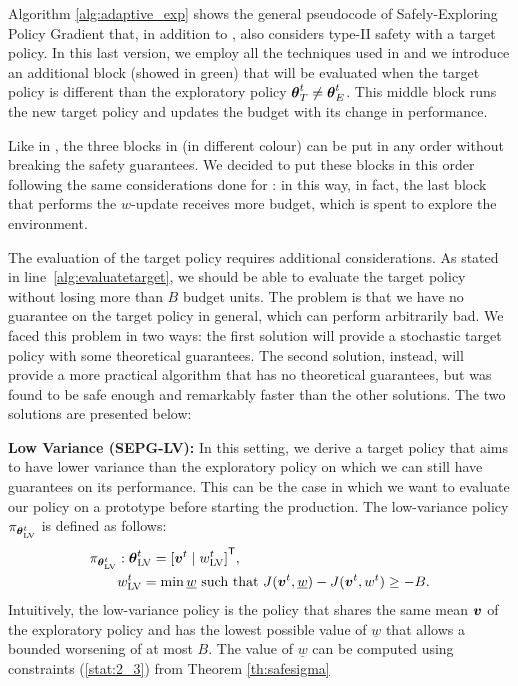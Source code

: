 Algorithm \ref{alg:adaptive_exp} shows the general pseudocode of Safely-Exploring Policy Gradient that, in addition to , also considers type-II safety with a target policy. In this last version, we employ all the techniques used in  and we introduce an additional block (showed in green) that will be evaluated when the target policy is different than the exploratory policy ${{\boldsymbol{\theta}}}^{t}_T \neq {\boldsymbol{\theta}}_E^t$. This middle block runs the new target policy and updates the budget with its change in performance.

\begin{note}
Like in , the three blocks in  (in different colour) can be put in any order without breaking the safety guarantees. We decided to put these blocks in this order following the same considerations done for : in this way, in fact, the last block that performs the $w$-update receives more budget, which is spent to explore the environment.
\end{note}

The evaluation of the target policy requires additional considerations. As stated in line~\ref{alg:evaluatetarget}, we should be able to evaluate the target policy without losing more than $B$ budget units. The problem is that we have no guarantee on the target policy in general, which can perform arbitrarily bad. We faced this problem in two ways: the first solution will provide a stochastic target policy with some theoretical guarantees. The second solution, instead, will provide a more practical algorithm that has no theoretical guarantees, but was found to be safe enough and remarkably faster than the other solutions. The two solutions are presented below:

\textbf{Low Variance (SEPG-LV):} In this setting, we derive a target policy that aims to have lower variance than the exploratory policy on which we can still have guarantees on its performance. This can be the case in which we want to evaluate our policy on a prototype before starting the production. The low-variance policy $\pi_{{\boldsymbol{\theta}}^t_{\text{LV}}}$ is defined as follows:
\begin{align*}
\pi_{{\boldsymbol{\theta}}^t_{\text{LV}}} &: {\boldsymbol{\theta}}^t_{\text{LV}} = {[\boldsymbol{v}^t \mid w^t_{\text{LV}}]}^{\mathsf{T}}, \\
&w^t_{\text{LV}} = \min {\underline{w}} \text{ such that } J(\boldsymbol{v}^t, \underline{w}) - J(\boldsymbol{v}^t, w^t) \geq -B .
\end{align*}
Intuitively, the low-variance policy is the policy that shares the same mean $\boldsymbol{v}$ of the exploratory policy and has the lowest possible value of $\underline{w}$ that allows a bounded worsening of at most $B$. The value of $\underline{w}$ can be computed using constraints (\ref{stat:2_3}) from Theorem \ref{th:safesigma}


